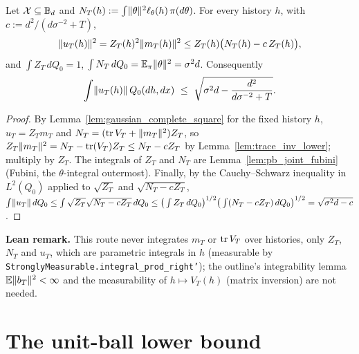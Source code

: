 \begin{lemma}\label{lem:posterior_second_moment}
\leanok
{}
Let $\mathcal{X} \subseteq \mathbb{B}_d$ and $N_T(h) := \int\lVert \theta \rVert^2\ell_\theta(h)\,\pi(d\theta)$. For
every history $h$, with $c := d^2/(d\sigma^{-2}+T)$,
\[
  \lVert u_T(h) \rVert^2 = Z_T(h)^2\lVert m_T(h) \rVert^2 \le Z_T(h)\big(N_T(h) - c\,Z_T(h)\big),
\]
and $\int Z_T\,dQ_0 = 1$, $\int N_T\,dQ_0 = \mathbb{E}_\pi\lVert \theta \rVert^2 = \sigma^2d$. Consequently
\[
  \int\norm{u_T(h)}\,Q_0(dh,dx)\ \le\ \sqrt{\sigma^2d - \frac{d^2}{d\sigma^{-2}+T}} .
\]
\end{lemma}

\begin{proof}
\leanok
{}
By Lemma~\ref{lem:gaussian_complete_square} for the fixed history $h$,
$u_T = Z_Tm_T$ and $N_T = (\operatorname{tr} V_T + \lVert m_T \rVert^2)Z_T$, so
$Z_T\lVert m_T \rVert^2 = N_T - \operatorname{tr}(V_T)Z_T \le N_T - cZ_T$ by Lemma~\ref{lem:trace_inv_lower}; multiply
by $Z_T$. The integrals of $Z_T$ and $N_T$ are Lemma~\ref{lem:pb_joint_fubini} (Fubini, the
$\theta$-integral outermost). Finally, by the Cauchy--Schwarz inequality in $L^2(Q_0)$ applied
to $\sqrt{Z_T}$ and $\sqrt{N_T - cZ_T}$,
$\int\lVert u_T \rVert\,dQ_0 \le \int\sqrt{Z_T}\sqrt{N_T-cZ_T}\,dQ_0
\le \big(\int Z_T\,dQ_0\big)^{1/2}\big(\int(N_T - cZ_T)\,dQ_0\big)^{1/2} = \sqrt{\sigma^2d - c}$.
\end{proof}

\textbf{Lean remark.} This route never integrates $m_T$ or $\operatorname{tr} V_T$ over histories, only
$Z_T$, $N_T$ and $u_T$, which are parametric integrals in $h$ (measurable by
\texttt{StronglyMeasurable.integral\_prod\_right'}); the outline's integrability lemma
$\mathbb{E}\lVert b_T \rVert^2 < \infty$ and the measurability of $h\mapsto V_T(h)$ (matrix inversion) are
not needed.

\section{The unit-ball lower bound}
\label{sec:pre_bayes_ball}

